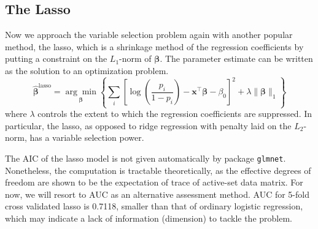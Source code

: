 \subsection{The Lasso}
Now we approach the variable selection problem again with another popular method, the lasso, which is a shrinkage method of the regression coefficients by putting a constraint on the $L_1$-norm of $\boldsymbol{\beta}$. The parameter estimate can be written as the solution to an optimization problem.
\[
\widehat{\boldsymbol{\beta}}^{\text{lasso}}=\underset{\boldsymbol{\beta}}{\arg\min}\left\{\sum_i\left[\log\left(\frac{p_i}{1-p_i}\right)-\mathbf{x}^\top\boldsymbol{\beta}-\beta_0\right]^2+\lambda\|\boldsymbol{\beta}\|_1\right\}
\]
where $\lambda$ controls the extent to which the regression coefficients are suppressed. In particular, the lasso, as opposed to ridge regression with penalty laid on the $L_2$-norm, has a variable selection power.
\par The AIC of the lasso model is not given automatically by package \texttt{glmnet}. Nonetheless, the computation is tractable theoretically, as the effective degrees of freedom are shown to be the expectation of trace of active-set data matrix. For now, we will resort to AUC as an alternative assessment method. AUC for 5-fold cross validated lasso is 0.7118, smaller than that of ordinary logistic regression, which may indicate a lack of information (dimension) to tackle the problem.

